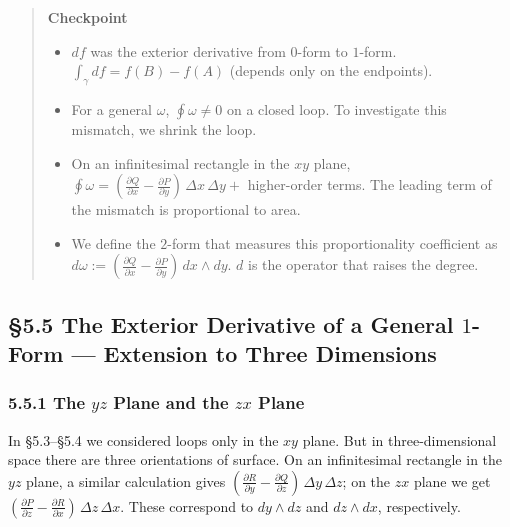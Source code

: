 \documentclass[a4paper,12pt,openany]{book}
\begin{document}
\begin{quote}
\textbf{Checkpoint}

\begin{itemize}
\item
  \(df\) was the exterior derivative from \(0\)-form to \(1\)-form.
  \(\int_\gamma df = f(B)-f(A)\) (depends only on the endpoints).
\item
  For a general \(\omega\), \(\oint \omega \neq 0\) on a closed loop. To
  investigate this mismatch, we shrink the loop.
\item
  On an infinitesimal rectangle in the \(xy\) plane,
  \(\oint \omega = (\frac{\partial Q}{\partial x} - \frac{\partial P}{\partial y})\,\Delta x\,\Delta y +\)
  higher-order terms. The leading term of the mismatch is proportional
  to area.
\item
  We define the \(2\)-form that measures this proportionality
  coefficient as
  \(d\omega := (\frac{\partial Q}{\partial x} - \frac{\partial P}{\partial y})\,dx \wedge dy\).
  \(d\) is the operator that raises the degree.
\end{itemize}
\end{quote}

\par\vspace{0.35em}\par

\hypertarget{the-exterior-derivative-of-a-general-1-form-extension-to-three-dimensions}{%
\subsection{\texorpdfstring{§5.5 The Exterior Derivative of a General
\(1\)-Form — Extension to Three
Dimensions}{§5.5 The Exterior Derivative of a General 1-Form — Extension to Three Dimensions}}\label{the-exterior-derivative-of-a-general-1-form-extension-to-three-dimensions}}

\hypertarget{the-yz-plane-and-the-zx-plane}{%
\subsubsection{\texorpdfstring{5.5.1 The \(yz\) Plane and the \(zx\)
Plane}{5.5.1 The yz Plane and the zx Plane}}\label{the-yz-plane-and-the-zx-plane}}

In §5.3–§5.4 we considered loops only in the \(xy\) plane. But in
three-dimensional space there are three orientations of surface. On an
infinitesimal rectangle in the \(yz\) plane, a similar calculation gives
\((\frac{\partial R}{\partial y} - \frac{\partial Q}{\partial z})\,\Delta y\,\Delta z\);
on the \(zx\) plane we get
\((\frac{\partial P}{\partial z} - \frac{\partial R}{\partial x})\,\Delta z\,\Delta x\).
These correspond to \(dy \wedge dz\) and \(dz \wedge dx\), respectively.
\end{document}
